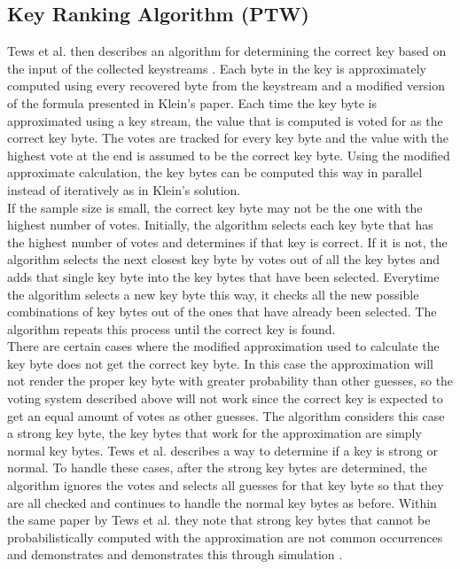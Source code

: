 \documentclass[10pt, titlepage]{article}
\begin{document}
\subsection{Key Ranking Algorithm (PTW)}
Tews et al. then describes an algorithm for determining the correct key based on the input of the collected keystreams \cite{mainPaper}. Each byte in the key is approximately computed using every recovered byte from the keystream and a modified version of the formula presented in Klein's paper. Each time the key byte is approximated using a key stream, the value that is computed is voted for as the correct key byte. The votes are tracked for every key byte and the value with the highest vote at the end is assumed to be the correct key byte. Using the modified approximate calculation, the key bytes can be computed this way in parallel instead of iteratively as in Klein's solution.\\

If the sample size is small, the correct key byte may not be the one with the highest number of votes. Initially, the algorithm selects each key byte that has the highest number of votes and determines if that key is correct. If it is not, the algorithm selects the next closest key byte by votes out of all the key bytes and adds that single key byte into the key bytes that have been selected. Everytime the algorithm selects a new key byte this way, it checks all the new possible combinations of key bytes out of the ones that have already been selected. The algorithm repeats this process until the correct key is found. \\

There are certain cases where the modified approximation used to calculate the key byte does not get the correct key byte. In this case the approximation will not render the proper key byte with greater probability than other guesses, so the voting system described above will not work since the correct key is expected to get an equal amount of votes as other guesses. The algorithm considers this case a strong key byte, the key bytes that work for the approximation are simply normal key bytes. Tews et al. describes a way to determine if a key is strong or normal. To handle these cases, after the strong key bytes are determined, the algorithm ignores the votes and selects all guesses for that key byte so that they are all checked and continues to handle the normal key bytes as before. Within the same paper by Tews et al. they note that strong key bytes that cannot be probabilistically computed with the approximation are not common occurrences and demonstrates and demonstrates this through simulation \cite{mainPaper}.\\
\end{document}
